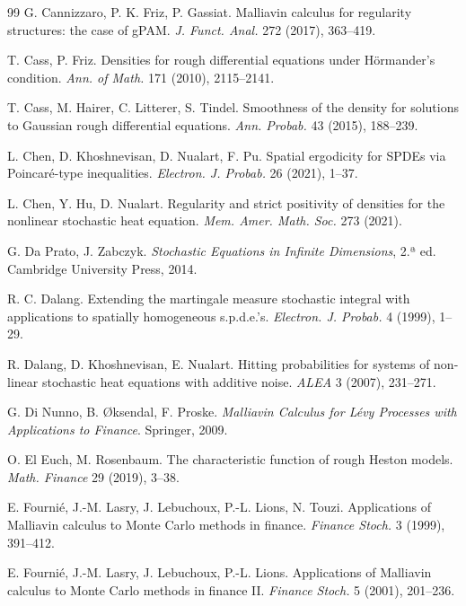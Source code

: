 \begin{thebibliography}{99}
 G. Cannizzaro, P. K. Friz, P. Gassiat. Malliavin calculus for regularity structures: the case of gPAM.
\emph{J. Funct. Anal.} 272 (2017), 363--419.

 T. Cass, P. Friz. Densities for rough differential equations under Hörmander's condition. \emph{Ann. of
Math.} 171 (2010), 2115--2141.

 T. Cass, M. Hairer, C. Litterer, S. Tindel. Smoothness of the density for solutions to Gaussian
rough differential equations. \emph{Ann. Probab.} 43 (2015), 188--239.

 L. Chen, D. Khoshnevisan, D. Nualart, F. Pu. Spatial ergodicity for SPDEs via Poincaré-type
inequalities. \emph{Electron. J. Probab.} 26 (2021), 1--37.

 L. Chen, Y. Hu, D. Nualart. Regularity and strict positivity of densities for the nonlinear stochastic
heat equation. \emph{Mem. Amer. Math. Soc.} 273 (2021).

 G. Da Prato, J. Zabczyk. \emph{Stochastic Equations in Infinite Dimensions}, 2.ª ed. Cambridge University
Press, 2014.

 R. C. Dalang. Extending the martingale measure stochastic integral with applications to spatially
homogeneous s.p.d.e.'s. \emph{Electron. J. Probab.} 4 (1999), 1--29.

 R. Dalang, D. Khoshnevisan, E. Nualart. Hitting probabilities for systems of non-linear stochastic
heat equations with additive noise. \emph{ALEA} 3 (2007), 231--271.

 G. Di Nunno, B. Øksendal, F. Proske. \emph{Malliavin Calculus for Lévy Processes with Applications to
Finance}. Springer, 2009.

 O. El Euch, M. Rosenbaum. The characteristic function of rough Heston models. \emph{Math. Finance} 29
(2019), 3--38.

 E. Fournié, J.-M. Lasry, J. Lebuchoux, P.-L. Lions, N. Touzi. Applications of Malliavin calculus to
Monte Carlo methods in finance. \emph{Finance Stoch.} 3 (1999), 391--412.

 E. Fournié, J.-M. Lasry, J. Lebuchoux, P.-L. Lions. Applications of Malliavin calculus to Monte
Carlo methods in finance II. \emph{Finance Stoch.} 5 (2001), 201--236.


\end{thebibliography}
